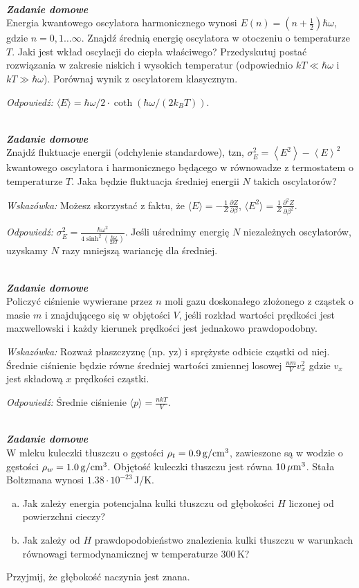 \documentclass[11pt,a4paper]{article}
\newcounter{zaddom}\newcommand{\zaddom}[1][]{\addtocounter{zaddom}{1} ~\\  {\bf \emph{Zadanie domowe \arabic{zaddom} #1 }} \\}
\begin{document}
\newpage

\zaddom
Energia kwantowego oscylatora harmonicznego wynosi $E(n)=(n+\frac{1}{2})\hbar\omega$,
gdzie $n = 0,1\ldots\infty$.
Znajdź średnią energię oscylatora w otoczeniu o temperaturze $T$.
Jaki jest wkład oscylacji do ciepła właściwego?
Przedyskutuj postać rozwiązania w zakresie niskich i wysokich
temperatur (odpowiednio $k T \ll \hbar\omega$ i $k T \gg \hbar\omega$).
Porównaj wynik z oscylatorem klasycznym.

\emph{Odpowiedź:} $\langle E \rangle =  \hbar \omega/2 \cdot  \coth(\hbar \omega / (2k_B T))$. 

\zaddom
Znajdź fluktuacje energii (odchylenie standardowe), tzn,
$\sigma_E^2= \left<E^2\right> - \left<E\right>^2 $ kwantowego oscylatora i
harmonicznego będącego w równowadze z termostatem o temperaturze $T$.
Jaka będzie fluktuacja średniej energii $N$ takich oscylatorów?
\newline

\noindent
\emph{Wskazówka:} Możesz skorzystać z faktu, że $\langle E \rangle = -\frac{1}{Z} \frac{\partial Z}{\partial \beta}$, $\langle E^2 \rangle = \frac{1}{Z} \frac{\partial^2 Z}{\partial \beta^2}$.
\newline

\noindent
\emph{Odpowiedź:}
$\sigma_E^2 =  \frac{\hbar \omega^2}{4 \sinh^2\left(\frac{\hbar \omega}{2 k T}\right)}$. Jeśli uśrednimy energię $N$ niezależnych oscylatorów, uzyskamy $N$ razy mniejszą wariancję dla średniej.

\zaddom
Policzyć ciśnienie wywierane przez $n$ moli gazu doskonałego
złożonego z cząstek o masie $m$ i znajdującego się w objętości $V$,
jeśli rozkład wartości prędkości jest maxwellowski i każdy kierunek prędkości
jest jednakowo prawdopodobny.
\newline

\emph{Wskazówka:} Rozważ płaszczyznę (np. yz) i sprężyste odbicie cząstki od niej. Średnie ciśnienie będzie równe średniej wartości zmiennej losowej $\frac{n m}{V} v_x^2$ gdzie $v_x$ jest  składową $x$ prędkości cząstki.
\newline

\emph{Odpowiedź:} %
Średnie ciśnienie $\langle p \rangle = \frac{n k T}{V}$.

\zaddom
W mleku kuleczki tłuszczu o gęstości $\rho_t=0.9\,{\rm g/cm^3}$,
zawieszone są w wodzie o gęstości $\rho_w=1.0\,{\rm g/cm^3}$.
Objętość kuleczki tłuszczu jest równa $10\,{\rm \mu m}^3$.
Stała Boltzmana wynosi $1.38\cdot 10^{-23}\,$J/K.
\begin{enumerate}[a)]
\item Jak zależy energia potencjalna kulki tłuszczu od głębokości $H$
liczonej od powierzchni cieczy?
\item Jak zależy od $H$ prawdopodobieństwo znalezienia kulki tłuszczu
w warunkach równowagi termodynamicznej w temperaturze 300\,K?
\end{enumerate}
Przyjmij, że głębokość naczynia jest znana.
\newline
\end{document}
